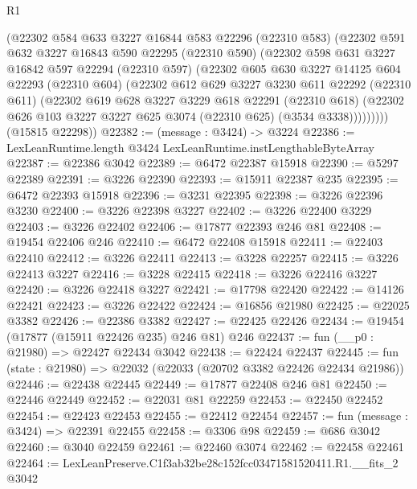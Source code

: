 \begin{lexlean}{R1}
\begin{coremodule}
        (@22302
          @584
          @633
          @3227
          @16844
          @583
          @22296
          (@22310 @583)
          (@22302
            @591
            @632
            @3227
            @16843
            @590
            @22295
            (@22310 @590)
            (@22302
              @598
              @631
              @3227
              @16842
              @597
              @22294
              (@22310 @597)
              (@22302
                @605
                @630
                @3227
                @14125
                @604
                @22293
                (@22310 @604)
                (@22302
                  @612
                  @629
                  @3227
                  @3230
                  @611
                  @22292
                  (@22310 @611)
                  (@22302
                    @619
                    @628
                    @3227
                    @3229
                    @618
                    @22291
                    (@22310 @618)
                    (@22302 @626 @103 @3227 @3227 @625 @3074 (@22310 @625) (@3534 @3338)))))))))
      (@15815 @22298))
@22382 := (message : @3424) -> @3224
@22386 := LexLeanRuntime.length @3424 LexLeanRuntime.instLengthableByteArray
@22387 := @22386 @3042
@22389 := @6472 @22387 @15918
@22390 := @5297 @22389
@22391 := @3226 @22390
@22393 := @15911 @22387 @235
@22395 := @6472 @22393 @15918
@22396 := @3231 @22395
@22398 := @3226 @22396 @3230
@22400 := @3226 @22398 @3227
@22402 := @3226 @22400 @3229
@22403 := @3226 @22402
@22406 := @17877 @22393 @246 @81
@22408 := @19454 @22406 @246
@22410 := @6472 @22408 @15918
@22411 := @22403 @22410
@22412 := @3226 @22411
@22413 := @3228 @22257
@22415 := @3226 @22413 @3227
@22416 := @3228 @22415
@22418 := @3226 @22416 @3227
@22420 := @3226 @22418 @3227
@22421 := @17798 @22420
@22422 := @14126 @22421
@22423 := @3226 @22422
@22424 := @16856 @21980
@22425 := @22025 @3382
@22426 := @22386 @3382
@22427 := @22425 @22426
@22434 := @19454 (@17877 (@15911 @22426 @235) @246 @81) @246
@22437 := fun (__p0 : @21980) => @22427 @22434 @3042
@22438 := @22424 @22437
@22445 := fun (state : @21980) => @22032 (@22033 (@20702 @3382 @22426 @22434 @21986))
@22446 := @22438 @22445
@22449 := @17877 @22408 @246 @81
@22450 := @22446 @22449
@22452 := @22031 @81 @22259
@22453 := @22450 @22452
@22454 := @22423 @22453
@22455 := @22412 @22454
@22457 := fun (message : @3424) => @22391 @22455
@22458 := @3306 @98
@22459 := @686 @3042
@22460 := @3040 @22459
@22461 := @22460 @3074
@22462 := @22458 @22461
@22464 := LexLeanPreserve.C1f3ab32be28c152fcc03471581520411.R1.__fits_2 @3042

\end{coremodule}
\end{lexlean}
